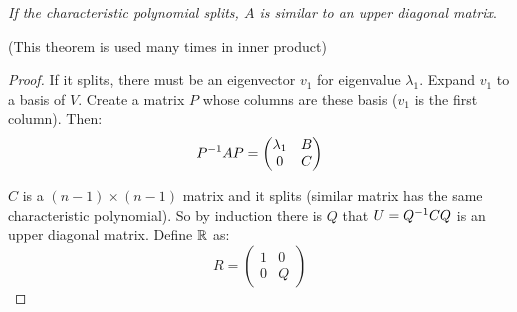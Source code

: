 \begin{theorem}\label{split_means_upper_trangular}
    \emph{If the characteristic polynomial splits, $A$ is similar to an upper diagonal matrix}.
    
    (This theorem is used many times in inner product)
\end{theorem}
\begin{proof}
    If it splits, there must be an eigenvector $v_1$ for eigenvalue $\lambda_1$. Expand $v_1$ to a basis of $V$. Create a matrix $P$ whose columns are these basis ($v_1$ is the first column). Then:
    \begin{equation*}
        {P}^{-1} A P = \begin{pmatrix}
            \lambda_1 & B \\
            0 & C
        \end{pmatrix}
    \end{equation*}
    
    $C$ is a $(n-1) \times (n-1)$ matrix and it splits (similar matrix has the same characteristic polynomial). So by induction there is $Q$ that $U= {Q}^{-1} C Q$ is an upper diagonal matrix. Define $\mathbb{R}$ as:
    \begin{equation*}
        R = \begin{pmatrix}
            1 & 0 \\
            0 & Q
        \end{pmatrix}
    \end{equation*}
    

\end{proof}
